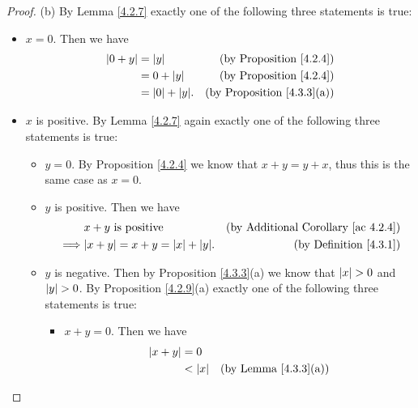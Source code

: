 \begin{proof}{(b)}
    By Lemma \ref{4.2.7} exactly one of the following three statements is true:
    \begin{itemize}
        \item \(x = 0\).
              Then we have
              \begin{align*}
                  \abs{0 + y} & = \abs{y}            & \text{(by Proposition \ref{4.2.4})}    \\
                              & = 0 + \abs{y}        & \text{(by Proposition \ref{4.2.4})}    \\
                              & = \abs{0} + \abs{y}. & \text{(by Proposition \ref{4.3.3}(a))}
              \end{align*}
        \item \(x\) is positive.
              By Lemma \ref{4.2.7} again exactly one of the following three statements is true:
              \begin{itemize}
                  \item \(y = 0\).
                        By Proposition \ref{4.2.4} we know that \(x + y = y + x\), thus this is the same case as \(x = 0\).
                  \item \(y\) is positive.
                        Then we have
                        \begin{align*}
                                     & x + y \text{ is positive}                & \text{(by Additional Corollary \ref{ac 4.2.4})} \\
                            \implies & \abs{x + y} = x + y = \abs{x} + \abs{y}. & \text{(by Definition \ref{4.3.1})}
                        \end{align*}
                  \item \(y\) is negative.
                        Then by Proposition \ref{4.3.3}(a) we know that \(\left\lvert x\right\rvert > 0\) and \(\left\lvert y\right\rvert > 0\).
                        By Proposition \ref{4.2.9}(a) exactly one of the following three statements is true:
                        \begin{itemize}
                            \item \(x + y = 0\).
                                  Then we have
                                  \begin{align*}
                                      \abs{x + y} & = 0                                                           \\
                                                  & < \abs{x}            & \text{(by Lemma \ref{4.3.3}(a))}       \\

\end{align*}
\end{itemize}
\end{itemize}
\end{itemize}
\end{proof}
